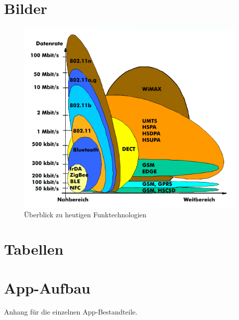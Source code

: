 \renewcommand{\thesection}{\Alph{section}}
\setcounter{figure}{0}
\renewcommand{\thefigure}{\Alph{section}.\arabic{figure}}
\appendix
{}

\captionsetup{list=false}

\section{Bilder}
\begin{figure}[H]
\centering
\includegraphics[scale=1]{Bilder/Funktechnologien.png} 
\caption{Überblick zu heutigen Funktechnologien \cite{FUE}}
\label{fig:FUE}
\end{figure}
\section{Tabellen}


\section{App-Aufbau}
Anhang für die einzelnen App-Bestandteile.

